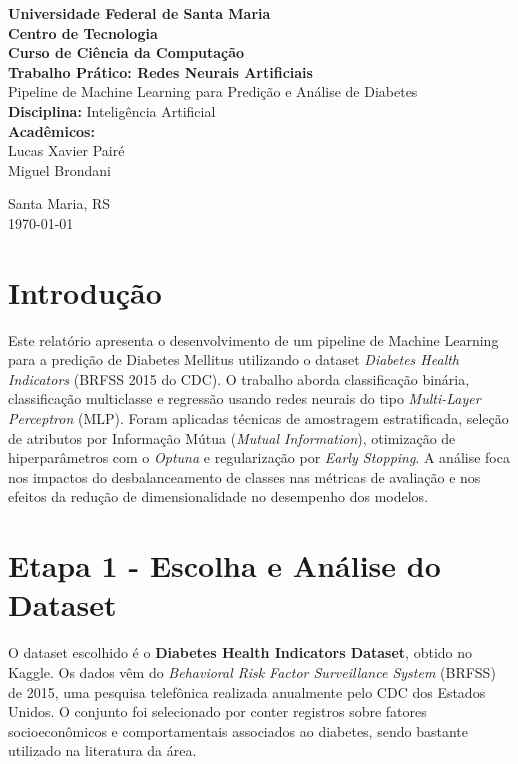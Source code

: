 \documentclass[12pt,a4paper]{article}
\begin{document}
\begin{titlepage}
    \centering
    \vfill
    {\Large \textbf{Universidade Federal de Santa Maria}} \\[0.4cm]
    {\large \textbf{Centro de Tecnologia}} \\[0.4cm]
    {\large \textbf{Curso de Ciência da Computação}} \\[3cm]
    
    {\Large \textbf{Trabalho Prático: Redes Neurais Artificiais}} \\[0.5cm]
    {\large Pipeline de Machine Learning para Predição e Análise de Diabetes} \\[4cm]
    
        \textbf{Disciplina:} Inteligência Artificial \\
        \textbf{Acadêmicos:} \\
        Lucas Xavier Pairé \\
        Miguel Brondani
    
    \vfill
    {\large Santa Maria, RS} \\
    {\large \today}
    \vfill
\end{titlepage}

\newpage
\tableofcontents
\newpage

\section{Introdução}
Este relatório apresenta o desenvolvimento de um pipeline de Machine Learning para a predição de Diabetes Mellitus utilizando o dataset \textit{Diabetes Health Indicators} (BRFSS 2015 do CDC). O trabalho aborda classificação binária, classificação multiclasse e regressão usando redes neurais do tipo \textit{Multi-Layer Perceptron} (MLP). Foram aplicadas técnicas de amostragem estratificada, seleção de atributos por Informação Mútua (\textit{Mutual Information}), otimização de hiperparâmetros com o \textit{Optuna} e regularização por \textit{Early Stopping}. A análise foca nos impactos do desbalanceamento de classes nas métricas de avaliação e nos efeitos da redução de dimensionalidade no desempenho dos modelos.

\section{Etapa 1 - Escolha e Análise do Dataset}
O dataset escolhido é o \textbf{Diabetes Health Indicators Dataset}, obtido no Kaggle. Os dados vêm do \textit{Behavioral Risk Factor Surveillance System} (BRFSS) de 2015, uma pesquisa telefônica realizada anualmente pelo CDC dos Estados Unidos. O conjunto foi selecionado por conter registros sobre fatores socioeconômicos e comportamentais associados ao diabetes, sendo bastante utilizado na literatura da área.
\end{document}
